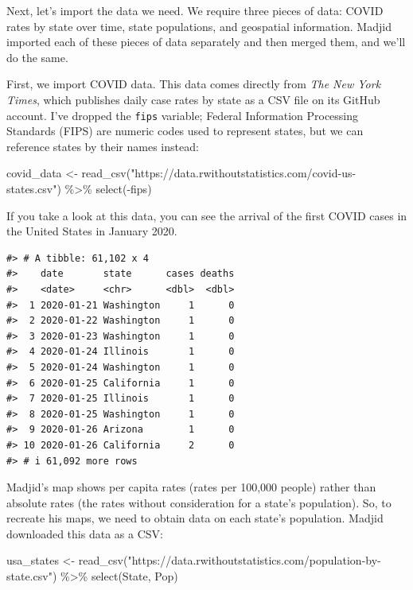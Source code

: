 \documentclass[
]{book}
\newenvironment{Shaded}{\begin{snugshade}}{\end{snugshade}}
\newcommand{\FunctionTok}[1]{\textcolor[rgb]{0.00,0.00,0.00}{#1}}
\newcommand{\NormalTok}[1]{#1}
\newcommand{\OtherTok}[1]{\textcolor[rgb]{0.56,0.35,0.01}{#1}}
\newcommand{\SpecialCharTok}[1]{\textcolor[rgb]{0.00,0.00,0.00}{#1}}
\newcommand{\StringTok}[1]{\textcolor[rgb]{0.31,0.60,0.02}{#1}}
\begin{document}
Next, let's import the data we need. We require three pieces of data: COVID rates by state over time, state populations, and geospatial information. Madjid imported each of these pieces of data separately and then merged them, and we'll do the same.

First, we import COVID data. This data comes directly from \emph{The New York Times}, which publishes daily case rates by state as a CSV file on its GitHub account. I've dropped the \texttt{fips} variable; Federal Information Processing Standards (FIPS) are numeric codes used to represent states, but we can reference states by their names instead:

\begin{Shaded}
\begin{Highlighting}[]
\NormalTok{covid\_data }\OtherTok{\textless{}{-}} \FunctionTok{read\_csv}\NormalTok{(}\StringTok{"https://data.rwithoutstatistics.com/covid{-}us{-}states.csv"}\NormalTok{) }\SpecialCharTok{\%\textgreater{}\%}
  \FunctionTok{select}\NormalTok{(}\SpecialCharTok{{-}}\NormalTok{fips)}
\end{Highlighting}
\end{Shaded}

If you take a look at this data, you can see the arrival of the first COVID cases in the United States in January 2020.

\begin{verbatim}
#> # A tibble: 61,102 x 4
#>    date       state      cases deaths
#>    <date>     <chr>      <dbl>  <dbl>
#>  1 2020-01-21 Washington     1      0
#>  2 2020-01-22 Washington     1      0
#>  3 2020-01-23 Washington     1      0
#>  4 2020-01-24 Illinois       1      0
#>  5 2020-01-24 Washington     1      0
#>  6 2020-01-25 California     1      0
#>  7 2020-01-25 Illinois       1      0
#>  8 2020-01-25 Washington     1      0
#>  9 2020-01-26 Arizona        1      0
#> 10 2020-01-26 California     2      0
#> # i 61,092 more rows
\end{verbatim}

Madjid's map shows per capita rates (rates per 100,000 people) rather than absolute rates (the rates without consideration for a state's population). So, to recreate his maps, we need to obtain data on each state's population. Madjid downloaded this data as a CSV:

\begin{Shaded}
\begin{Highlighting}[]
\NormalTok{usa\_states }\OtherTok{\textless{}{-}} \FunctionTok{read\_csv}\NormalTok{(}\StringTok{"https://data.rwithoutstatistics.com/population{-}by{-}state.csv"}\NormalTok{) }\SpecialCharTok{\%\textgreater{}\%}
  \FunctionTok{select}\NormalTok{(State, Pop)}
\end{Highlighting}
\end{Shaded}
\end{document}
